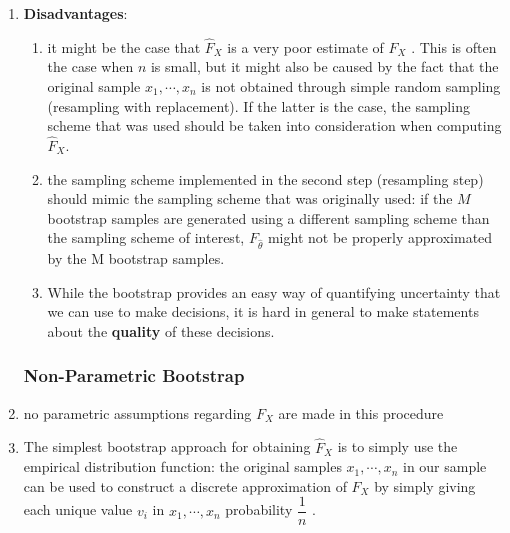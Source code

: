 \begin{enumerate}
    \item \textbf{Disadvantages}:
    \begin{enumerate}
        \item it might be the case that $\hat{F}_X$ is a very poor estimate of $F_X$ .
        This is often the case when $n$ is small, but it might also be caused by the fact that the original sample $x_1, \cdots , x_n$ is not obtained through simple random sampling (resampling with replacement).
        If the latter is the case, the sampling scheme that was used should be taken into consideration when computing $\hat{F}_X$.
        \hfill \cite{statistics/book/Statistics-for-Data-Scientists/Maurits-Kaptein}

        \item the sampling scheme implemented in the second step (resampling step) should mimic the sampling scheme that was originally used: if the $M$ bootstrap samples are generated using a different sampling scheme than the sampling scheme of interest, $F_{\hat{\theta}}$ might not be properly approximated by the M bootstrap samples.
        \hfill \cite{statistics/book/Statistics-for-Data-Scientists/Maurits-Kaptein}

        \item While the bootstrap provides an easy way of quantifying uncertainty that we can use to make decisions, it is hard in general to make statements about the \textbf{quality} of these decisions.
        \hfill \cite{statistics/book/Statistics-for-Data-Scientists/Maurits-Kaptein}
    \end{enumerate}

\subsubsection{Non-Parametric Bootstrap}

    \item no parametric assumptions regarding $F_X$ are made in this procedure
    \hfill \cite{statistics/book/Statistics-for-Data-Scientists/Maurits-Kaptein}

    \item  The simplest bootstrap approach for obtaining $\hat{F}_X$ is to simply use the empirical distribution function: the original samples $x_1, \cdots , x_n$ in our sample can be used to construct a discrete approximation of $F_X$ by simply giving each unique value $v_i$ in $x_1, \cdots , x_n$ probability $\dfrac{1}{n}$ .
    \hfill \cite{statistics/book/Statistics-for-Data-Scientists/Maurits-Kaptein}


\end{enumerate}
